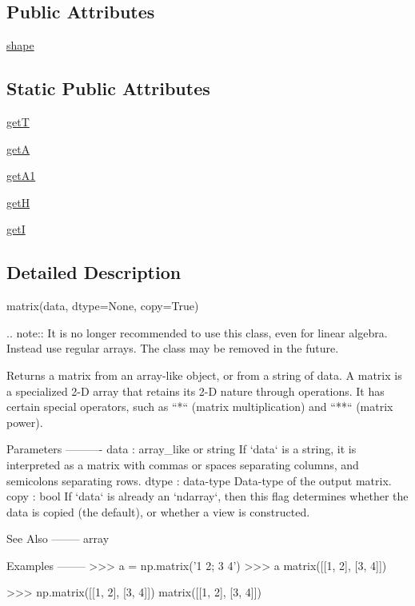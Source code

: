 \subsection*{Public Attributes}
\begin{DoxyCompactItemize}
\item 
\hyperlink{classnumpy_1_1matrixlib_1_1defmatrix_1_1matrix_a96c91d30a35f29df99cc776d0de11999}{shape}
\end{DoxyCompactItemize}
\subsection*{Static Public Attributes}
\begin{DoxyCompactItemize}
\item 
\hyperlink{classnumpy_1_1matrixlib_1_1defmatrix_1_1matrix_a4c567b7fd75907cbf35cc8893dbcd6e3}{getT}
\item 
\hyperlink{classnumpy_1_1matrixlib_1_1defmatrix_1_1matrix_af64a2a07a207cba914b03d1bc13d27ec}{getA}
\item 
\hyperlink{classnumpy_1_1matrixlib_1_1defmatrix_1_1matrix_a8e7db42cbac2f63071a13ae13c6d5200}{get\+A1}
\item 
\hyperlink{classnumpy_1_1matrixlib_1_1defmatrix_1_1matrix_a2da7e1081508cc6017e0f8563afa46da}{getH}
\item 
\hyperlink{classnumpy_1_1matrixlib_1_1defmatrix_1_1matrix_a5e82b0afd9f47632ad2ce8f43330a1cd}{getI}
\end{DoxyCompactItemize}


\subsection{Detailed Description}
\begin{DoxyVerb}matrix(data, dtype=None, copy=True)

.. note:: It is no longer recommended to use this class, even for linear
          algebra. Instead use regular arrays. The class may be removed
          in the future.

Returns a matrix from an array-like object, or from a string of data.
A matrix is a specialized 2-D array that retains its 2-D nature
through operations.  It has certain special operators, such as ``*``
(matrix multiplication) and ``**`` (matrix power).

Parameters
----------
data : array_like or string
   If `data` is a string, it is interpreted as a matrix with commas
   or spaces separating columns, and semicolons separating rows.
dtype : data-type
   Data-type of the output matrix.
copy : bool
   If `data` is already an `ndarray`, then this flag determines
   whether the data is copied (the default), or whether a view is
   constructed.

See Also
--------
array

Examples
--------
>>> a = np.matrix('1 2; 3 4')
>>> a
matrix([[1, 2],
        [3, 4]])

>>> np.matrix([[1, 2], [3, 4]])
matrix([[1, 2],
        [3, 4]])\end{DoxyVerb}
 

